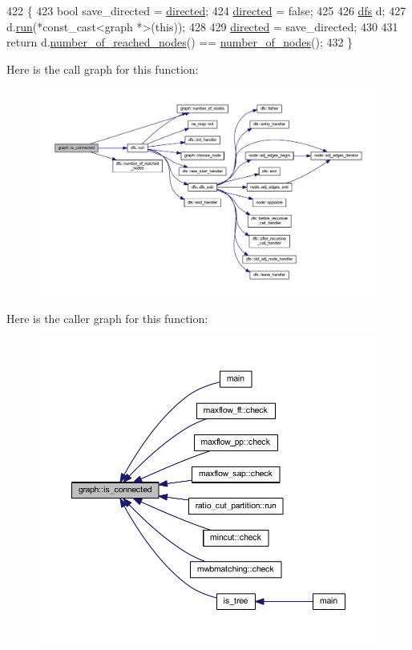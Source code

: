\begin{DoxyCode}
422 \{
423     \textcolor{keywordtype}{bool} save\_directed = \mbox{\hyperlink{classgraph_ab4120df210eb3d03d20b0bd27f8cbe8c}{directed}};
424     \mbox{\hyperlink{classgraph_ab4120df210eb3d03d20b0bd27f8cbe8c}{directed}} = \textcolor{keyword}{false};
425     
426     \mbox{\hyperlink{classdfs}{dfs}} d;
427     d.\mbox{\hyperlink{classdfs_af0863b8974d5fd58cd0375c78ed8163b}{run}}(*const\_cast<graph *>(\textcolor{keyword}{this}));
428 
429     \mbox{\hyperlink{classgraph_ab4120df210eb3d03d20b0bd27f8cbe8c}{directed}} = save\_directed;
430 
431     \textcolor{keywordflow}{return} d.\mbox{\hyperlink{classdfs_ae8849a552721ad4af5d9a81c6da35822}{number\_of\_reached\_nodes}}() == \mbox{\hyperlink{classgraph_a42c78e0a9f115655e3ff0efe35ebfc4e}{number\_of\_nodes}}();
432 \}
\end{DoxyCode}
Here is the call graph for this function\+:
\nopagebreak
\begin{figure}[H]
\begin{center}
\leavevmode
\includegraphics[width=350pt]{classgraph_a599e2bf967df8a2052a9892c94db98b7_cgraph}
\end{center}
\end{figure}
Here is the caller graph for this function\+:
\nopagebreak
\begin{figure}[H]
\begin{center}
\leavevmode
\includegraphics[width=350pt]{classgraph_a599e2bf967df8a2052a9892c94db98b7_icgraph}
\end{center}
\end{figure}
